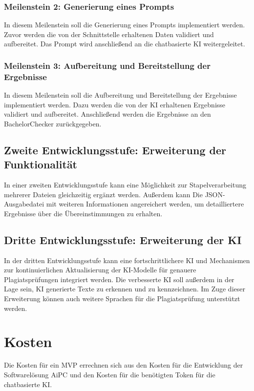 \subsubsection{Meilenstein 2: Generierung eines Prompts}
In diesem Meilenstein soll die Generierung eines Prompts implementiert werden.
Zuvor werden die von der Schnittstelle erhaltenen Daten validiert und aufbereitet.
Das Prompt wird anschließend an die chatbasierte \ac{KI} weitergeleitet.

\subsubsection{Meilenstein 3: Aufbereitung und Bereitstellung der Ergebnisse}
In diesem Meilenstein soll die Aufbereitung und Bereitstellung der Ergebnisse implementiert werden.
Dazu werden die von der \ac{KI} erhaltenen Ergebnisse validiert und aufbereitet.
Anschließend werden die Ergebnisse an den BachelorChecker zurückgegeben.

\subsection{Zweite Entwicklungsstufe: Erweiterung der Funktionalität}
In einer zweiten Entwicklungsstufe kann eine Möglichkeit zur Stapelverarbeitung mehrerer Dateien gleichzeitig ergänzt werden. 
Außerdem kann Die \ac{JSON}-Ausgabedatei mit weiteren Informationen angereichert werden, um detailliertere Ergebnisse über die Übereinstimmungen zu erhalten.

\subsection{Dritte Entwicklungsstufe: Erweiterung der KI}
In der dritten Entwicklungsstufe kann eine fortschrittlichere \ac{KI} und Mechanismen zur kontinuierlichen Aktualisierung der \ac{KI}-Modelle für genauere Plagiatsprüfungen integriert werden.
Die verbesserte \ac{KI} soll außerdem in der Lage sein, \ac{KI} generierte Texte zu erkennen und zu kennzeichnen.
Im Zuge dieser Erweiterung können auch weitere Sprachen für die Plagiatsprüfung unterstützt werden.

\section{Kosten}\label{sec:kosten}

Die Kosten für ein \ac{MVP} errechnen sich aus den Kosten für die Entwicklung der Softwarelösung \ac{AiPC} und den Kosten für die benötigten Token für die chatbasierte \ac{KI}.

